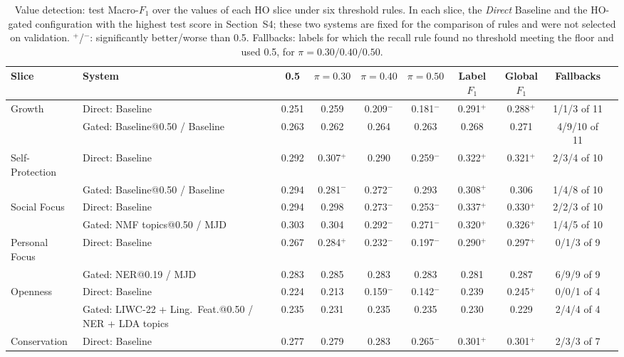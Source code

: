 \begin{table}[!htbp]
\centering
\scriptsize
\caption{Value detection: test Macro-$F_1$ over the values of each HO slice under six threshold rules. In each slice, the \emph{Direct} Baseline and the HO-gated configuration with the highest test score in Section~S4; these two systems are fixed for the comparison of rules and were not selected on validation. $^{+}$/$^{-}$: significantly better/worse than 0.5. Fallbacks: labels for which the recall rule found no threshold meeting the floor and used 0.5, for $\pi=0.30/0.40/0.50$.}
\label{tab:s8-rules-values}
\begin{tabularx}{\textwidth}{lXcccccccc}
\hline
\textbf{Slice} & \textbf{System} & \textbf{0.5} & \textbf{$\pi{=}0.30$} & \textbf{$\pi{=}0.40$} & \textbf{$\pi{=}0.50$} & \textbf{Label $F_1$} & \textbf{Global $F_1$} & \textbf{Fallbacks} \\
\hline
Growth & Direct: Baseline & 0.251 & 0.259 & 0.209$^{-}$ & 0.181$^{-}$ & 0.291$^{+}$ & 0.288$^{+}$ & 1/1/3 of 11 \\
 & Gated: Baseline@0.50 / Baseline & 0.263 & 0.262 & 0.264 & 0.263 & 0.268 & 0.271 & 4/9/10 of 11 \\
Self-Protection & Direct: Baseline & 0.292 & 0.307$^{+}$ & 0.290 & 0.259$^{-}$ & 0.322$^{+}$ & 0.321$^{+}$ & 2/3/4 of 10 \\
 & Gated: Baseline@0.50 / Baseline & 0.294 & 0.281$^{-}$ & 0.272$^{-}$ & 0.293 & 0.308$^{+}$ & 0.306 & 1/4/8 of 10 \\
Social Focus & Direct: Baseline & 0.294 & 0.298 & 0.273$^{-}$ & 0.253$^{-}$ & 0.337$^{+}$ & 0.330$^{+}$ & 2/2/3 of 10 \\
 & Gated: NMF topics@0.50 / MJD & 0.303 & 0.304 & 0.292$^{-}$ & 0.271$^{-}$ & 0.320$^{+}$ & 0.326$^{+}$ & 1/4/5 of 10 \\
Personal Focus & Direct: Baseline & 0.267 & 0.284$^{+}$ & 0.232$^{-}$ & 0.197$^{-}$ & 0.290$^{+}$ & 0.297$^{+}$ & 0/1/3 of 9 \\
 & Gated: NER@0.19 / MJD & 0.283 & 0.285 & 0.283 & 0.283 & 0.281 & 0.287 & 6/9/9 of 9 \\
Openness & Direct: Baseline & 0.224 & 0.213 & 0.159$^{-}$ & 0.142$^{-}$ & 0.239 & 0.245$^{+}$ & 0/0/1 of 4 \\
 & Gated: LIWC-22 + Ling.\ Feat.@0.50 / NER + LDA topics & 0.235 & 0.231 & 0.235 & 0.235 & 0.230 & 0.229 & 2/4/4 of 4 \\
Conservation & Direct: Baseline & 0.277 & 0.279 & 0.283 & 0.265$^{-}$ & 0.301$^{+}$ & 0.301$^{+}$ & 2/3/3 of 7 \\

\end{tabularx}
\end{table}
